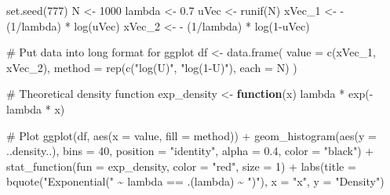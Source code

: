 \documentclass[
  letterpaper,
  DIV=11,
  numbers=noendperiod]{scrreprt}
\newenvironment{Shaded}{\begin{snugshade}}{\end{snugshade}}
\newcommand{\AttributeTok}[1]{\textcolor[rgb]{0.40,0.45,0.13}{#1}}
\newcommand{\CommentTok}[1]{\textcolor[rgb]{0.37,0.37,0.37}{#1}}
\newcommand{\ControlFlowTok}[1]{\textcolor[rgb]{0.00,0.23,0.31}{\textbf{#1}}}
\newcommand{\DecValTok}[1]{\textcolor[rgb]{0.68,0.00,0.00}{#1}}
\newcommand{\FloatTok}[1]{\textcolor[rgb]{0.68,0.00,0.00}{#1}}
\newcommand{\FunctionTok}[1]{\textcolor[rgb]{0.28,0.35,0.67}{#1}}
\newcommand{\NormalTok}[1]{\textcolor[rgb]{0.00,0.23,0.31}{#1}}
\newcommand{\OtherTok}[1]{\textcolor[rgb]{0.00,0.23,0.31}{#1}}
\newcommand{\SpecialCharTok}[1]{\textcolor[rgb]{0.37,0.37,0.37}{#1}}
\newcommand{\StringTok}[1]{\textcolor[rgb]{0.13,0.47,0.30}{#1}}
\begin{document}
\begin{Shaded}
\begin{Highlighting}[]
\FunctionTok{set.seed}\NormalTok{(}\DecValTok{777}\NormalTok{)}
\NormalTok{N }\OtherTok{\textless{}{-}} \DecValTok{1000}
\NormalTok{lambda }\OtherTok{\textless{}{-}} \FloatTok{0.7}
\NormalTok{uVec }\OtherTok{\textless{}{-}} \FunctionTok{runif}\NormalTok{(N)}
\NormalTok{xVec\_1 }\OtherTok{\textless{}{-}} \SpecialCharTok{{-}}\NormalTok{ (}\DecValTok{1}\SpecialCharTok{/}\NormalTok{lambda) }\SpecialCharTok{*} \FunctionTok{log}\NormalTok{(uVec)}
\NormalTok{xVec\_2 }\OtherTok{\textless{}{-}} \SpecialCharTok{{-}}\NormalTok{ (}\DecValTok{1}\SpecialCharTok{/}\NormalTok{lambda) }\SpecialCharTok{*} \FunctionTok{log}\NormalTok{(}\DecValTok{1}\SpecialCharTok{{-}}\NormalTok{uVec)}

\CommentTok{\# Put data into long format for ggplot}
\NormalTok{df }\OtherTok{\textless{}{-}} \FunctionTok{data.frame}\NormalTok{(}
  \AttributeTok{value =} \FunctionTok{c}\NormalTok{(xVec\_1, xVec\_2),}
  \AttributeTok{method =} \FunctionTok{rep}\NormalTok{(}\FunctionTok{c}\NormalTok{(}\StringTok{"log(U)"}\NormalTok{, }\StringTok{"log(1{-}U)"}\NormalTok{), }\AttributeTok{each =}\NormalTok{ N)}
\NormalTok{)}

\CommentTok{\# Theoretical density function}
\NormalTok{exp\_density }\OtherTok{\textless{}{-}} \ControlFlowTok{function}\NormalTok{(x) lambda }\SpecialCharTok{*} \FunctionTok{exp}\NormalTok{(}\SpecialCharTok{{-}}\NormalTok{lambda }\SpecialCharTok{*}\NormalTok{ x)}

\CommentTok{\# Plot}
\FunctionTok{ggplot}\NormalTok{(df, }\FunctionTok{aes}\NormalTok{(}\AttributeTok{x =}\NormalTok{ value, }\AttributeTok{fill =}\NormalTok{ method)) }\SpecialCharTok{+}
  \FunctionTok{geom\_histogram}\NormalTok{(}\FunctionTok{aes}\NormalTok{(}\AttributeTok{y =}\NormalTok{ ..density..), }\AttributeTok{bins =} \DecValTok{40}\NormalTok{,}
                 \AttributeTok{position =} \StringTok{"identity"}\NormalTok{, }\AttributeTok{alpha =} \FloatTok{0.4}\NormalTok{, }\AttributeTok{color =} \StringTok{"black"}\NormalTok{) }\SpecialCharTok{+}
  \FunctionTok{stat\_function}\NormalTok{(}\AttributeTok{fun =}\NormalTok{ exp\_density, }\AttributeTok{color =} \StringTok{"red"}\NormalTok{, }\AttributeTok{size =} \DecValTok{1}\NormalTok{) }\SpecialCharTok{+}
  \FunctionTok{labs}\NormalTok{(}\AttributeTok{title =} \FunctionTok{bquote}\NormalTok{(}\StringTok{"Exponential("} \SpecialCharTok{\textasciitilde{}}\NormalTok{ lambda }\SpecialCharTok{==}\NormalTok{ .(lambda) }\SpecialCharTok{\textasciitilde{}} \StringTok{")"}\NormalTok{),}
       \AttributeTok{x =} \StringTok{"x"}\NormalTok{, }\AttributeTok{y =} \StringTok{"Density"}\NormalTok{) }
\end{Highlighting}
\end{Shaded}
\end{document}

